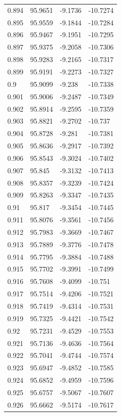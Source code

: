 \begin{tabular}{llll}
0.894 & 95.9651 & -9.1736 & -10.7274 \\
0.895 & 95.9559 & -9.1844 & -10.7284 \\
0.896 & 95.9467 & -9.1951 & -10.7295 \\
0.897 & 95.9375 & -9.2058 & -10.7306 \\
0.898 & 95.9283 & -9.2165 & -10.7317 \\
0.899 & 95.9191 & -9.2273 & -10.7327 \\
0.9 & 95.9099 & -9.238 & -10.7338 \\
0.901 & 95.9006 & -9.2487 & -10.7349 \\
0.902 & 95.8914 & -9.2595 & -10.7359 \\
0.903 & 95.8821 & -9.2702 & -10.737 \\
0.904 & 95.8728 & -9.281 & -10.7381 \\
0.905 & 95.8636 & -9.2917 & -10.7392 \\
0.906 & 95.8543 & -9.3024 & -10.7402 \\
0.907 & 95.845 & -9.3132 & -10.7413 \\
0.908 & 95.8357 & -9.3239 & -10.7424 \\
0.909 & 95.8263 & -9.3347 & -10.7435 \\
0.91 & 95.817 & -9.3454 & -10.7445 \\
0.911 & 95.8076 & -9.3561 & -10.7456 \\
0.912 & 95.7983 & -9.3669 & -10.7467 \\
0.913 & 95.7889 & -9.3776 & -10.7478 \\
0.914 & 95.7795 & -9.3884 & -10.7488 \\
0.915 & 95.7702 & -9.3991 & -10.7499 \\
0.916 & 95.7608 & -9.4099 & -10.751 \\
0.917 & 95.7514 & -9.4206 & -10.7521 \\
0.918 & 95.7419 & -9.4314 & -10.7531 \\
0.919 & 95.7325 & -9.4421 & -10.7542 \\
0.92 & 95.7231 & -9.4529 & -10.7553 \\
0.921 & 95.7136 & -9.4636 & -10.7564 \\
0.922 & 95.7041 & -9.4744 & -10.7574 \\
0.923 & 95.6947 & -9.4852 & -10.7585 \\
0.924 & 95.6852 & -9.4959 & -10.7596 \\
0.925 & 95.6757 & -9.5067 & -10.7607 \\
0.926 & 95.6662 & -9.5174 & -10.7617 \\

\end{tabular}
